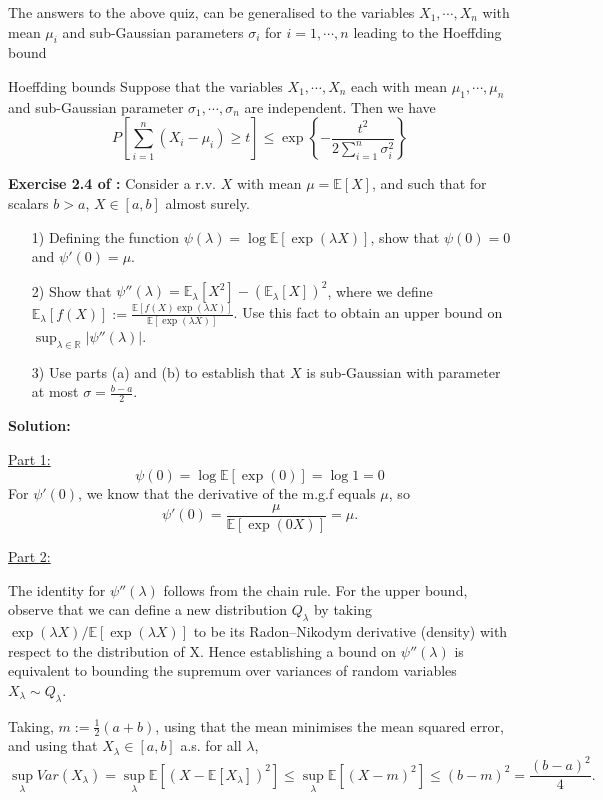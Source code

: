 \documentclass[10pt,handout,english]{beamer}
\newcommand{\E}{\mathbb{E}}
\newcommand{\R}{\mathbb{R}}
\newcommand{\1}{\mathbbm{1}}
\begin{document}
\begin{frame}
The answers to the above quiz, can be generalised to the variables $X_1,\cdots,X_n$ with mean $\mu_i$ and sub-Gaussian parameters $\sigma_i$ for $i=1,\cdots,n$ leading to the Hoeffding bound 
\begin{block}{Hoeffding bounds}
Suppose that the variables $X_1,\cdots,X_n$ each with mean $\mu_1,\cdots,\mu_n$ and sub-Gaussian parameter $\sigma_1,\cdots,\sigma_n$ are independent. Then we have
\[
P\left[\sum\limits_{i=1}^n(X_i-\mu_i)\geq t\right]\leq\exp\left\{-\frac{t^2}{2\sum_{i=1}^n\sigma_i^2}\right\}
\]
\end{block}
\end{frame}
\begin{frame}[allowframebreaks]
\textbf{Exercise 2.4 of \citet{wainwright2019high}:} Consider a r.v. $X$ with mean $\mu=\E[X]$, and such that for scalars $b>a$, $X\in[a,b]$ almost surely.
\begin{itemize}
\item[1)]Defining the function $\psi(\lambda)=\log\E[\exp(\lambda X)]$, show that $\psi(0)=0$ and $\psi'(0)=\mu$.
\item[2)]Show that $\psi''(\lambda)=\E_{\lambda}[X^2]-(\E_{\lambda}[X])^2$, where we define $\E_{\lambda}[f(X)]:=\frac{\E[f(X)\exp(\lambda X)]}{\E[\exp(\lambda X)]}$. Use this fact to obtain an upper bound on $\sup_{\lambda\in\R}\lvert\psi''(\lambda)\rvert$.
\item[3)] Use parts (a) and (b) to establish that $X$ is sub-Gaussian with parameter at most $\sigma=\frac{b-a}{2}$. 
\end{itemize}

\textbf{Solution:}

\underline{Part 1:}
\[
\psi(0)=\log\E[\exp(0)]=\log 1=0
\]
For $\psi'(0)$, we know that the derivative of the m.g.f equals $\mu$, so
\[
\psi'(0)=\frac{\mu}{\E[\exp(0X)]}=\mu.
\]

\underline{Part 2:}

The identity for $\psi''(\lambda)$ follows from the chain rule. For the upper bound, observe that we can define a new distribution $Q_{\lambda}$ by taking $\exp(\lambda X)/\E[\exp(\lambda X)]$ to be its Radon–Nikodym derivative (density) with respect to the distribution of X. Hence establishing a bound on $\psi''(\lambda)$ is equivalent to bounding the supremum over variances of random variables $X_{\lambda}\sim Q_{\lambda}$.

Taking, $m:=\frac{1}{2}(a+b)$, using that the mean minimises the mean squared error, and using that $X_{\lambda}\in[a,b ]$  a.s. for all $\lambda$,
\[
\sup_{\lambda} Var(X_{\lambda})=\sup_{\lambda} \E[(X-\E[X_{\lambda}])^2]\leq \sup_{\lambda} \E[(X-m)^2]\leq (b-m)^2=\frac{(b-a)^2}{4}.
\]


\end{frame}
\end{document}
